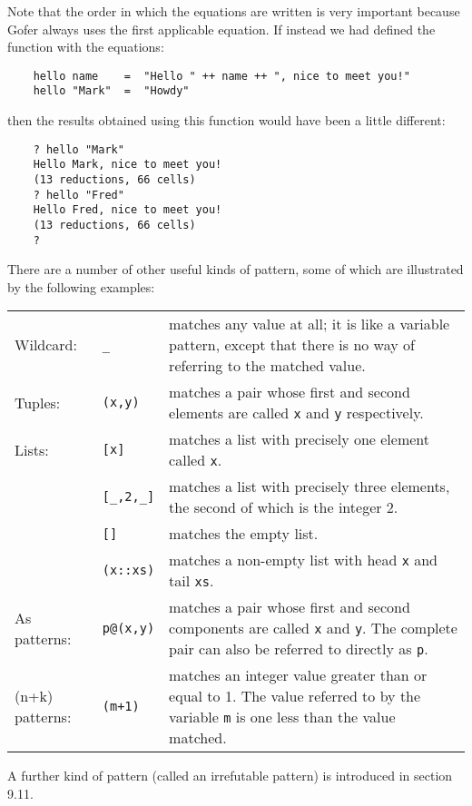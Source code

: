 Note that the  order  in  which  the  equations  are  written  is  very
important because Gofer always uses the first applicable equation.   If
instead we had defined the function with the equations:
\begin{verbatim}
    hello name    =  "Hello " ++ name ++ ", nice to meet you!"
    hello "Mark"  =  "Howdy"
\end{verbatim}
then the results obtained using this function would have been a  little
different:
\begin{verbatim}
    ? hello "Mark"
    Hello Mark, nice to meet you!
    (13 reductions, 66 cells)
    ? hello "Fred"
    Hello Fred, nice to meet you!
    (13 reductions, 66 cells)
    ?
\end{verbatim}
There are a number of other useful kinds of pattern, some of which  are
illustrated by the following examples:
\BQ
\begin{tabular}{llp{8cm}}
  Wildcard: &      \verb"_"  &      matches  any value  at all;  it is like a
                              variable pattern, except that there is no
                              way of referring to the matched value.\\
  Tuples:   &      \verb"(x,y)" &   matches a  pair  whose  first  and second
                              elements are called \verb"x" and \verb"y"
                              respectively.\\
  Lists:    &      \verb"[x]"   &   matches a list with precisely one element
                              called \verb"x".\\
            &      \verb"[_,2,_]"&  matches  a   list  with   precisely three
                              elements,  the  second  of  which  is the
                              integer 2.\\
            &      \verb"[]"   &    matches the empty list.\\
            &      \verb"(x::xs)"&   matches a non-empty  list with 
                                    head \verb"x" and
                                    tail \verb"xs".\\
  As patterns:&    \verb"p@(x,y)"&  matches a  pair  whose  first and  second
                              components  are  called  \verb"x"  
                              and  \verb"y".   The
                              complete pair can  also  be  referred  to
                              directly as \verb"p".\\
  (n+k) patterns:& \verb"(m+1)"  &  matches an integer value  greater than or
                              equal to 1.  The value referred to by the
                              variable \verb"m" is one  less  than  the  value
                              matched.
\end{tabular}
\EQ
A further kind of pattern (called an irrefutable pattern) is introduced
in section 9.11.

